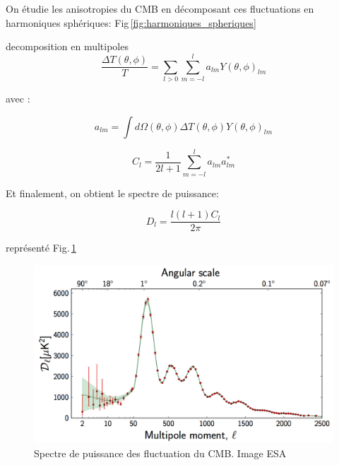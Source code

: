 On étudie les anisotropies du CMB en décomposant ces fluctuations en harmoniques sphériques:
Fig\,\ref{fig:harmoniques_spheriques}

decomposition en multipoles
\begin{equation}
 \frac{\Delta T(\theta,\phi)}{T} = \sum_{l>0} \sum_{m=-l}^l a_{lm} Y(\theta,\phi)_{lm}
\end{equation}

avec : 

\begin{equation}
a_{lm}= \int d\Omega(\theta,\phi) \Delta T (\theta,\phi) Y(\theta,\phi)_{lm}
\end{equation}



\begin{equation}
C_l = \frac{1}{2l+1} \sum_{m=-l}^l a_{lm} a_{lm}^*
\end{equation}


Et finalement, on obtient le spectre de puissance:

\begin{equation}
D_l = \frac{l (l+1) C_l }{2 \pi} 
\end{equation}

représenté Fig.\,\ref{fig:cmb_power_spectrum}

\begin{figure}[bth]
        \includegraphics[width=.95\linewidth]{img/01/CMB_power_spectrum.png} 
        \caption{Spectre de puissance des fluctuation du CMB.
        Image ESA}
 		\label{fig:cmb_power_spectrum}
\end{figure}





